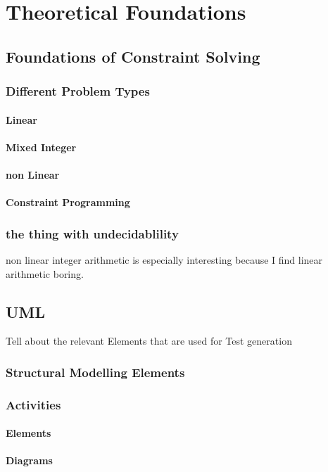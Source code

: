 \chapter{Theoretical Foundations}
\section{Foundations of Constraint Solving}
\subsection{Different Problem Types}
\subsubsection{Linear}
\subsubsection{Mixed Integer}
\subsubsection{non Linear}
\subsubsection{Constraint Programming}
\subsection{the thing with undecidablility}
non linear integer arithmetic is especially interesting because I find linear arithmetic boring.

\section{UML}
Tell about the relevant Elements that are used for Test generation
\subsection{Structural Modelling Elements}
\subsection{Activities}
\subsubsection{Elements}
\subsubsection{Diagrams}

